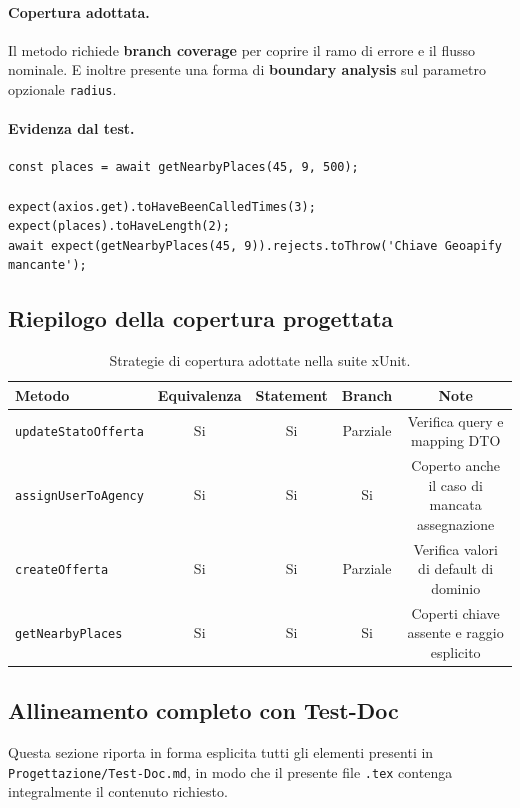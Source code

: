 \documentclass[a4paper,11pt]{article}
\begin{document}
\paragraph{Copertura adottata.}
Il metodo richiede \textbf{branch coverage} per coprire il ramo di errore e il flusso nominale. E inoltre presente una forma di \textbf{boundary analysis} sul parametro opzionale \texttt{radius}.

\paragraph{Evidenza dal test.}
\begin{lstlisting}[style=projectcode]
const places = await getNearbyPlaces(45, 9, 500);

expect(axios.get).toHaveBeenCalledTimes(3);
expect(places).toHaveLength(2);
await expect(getNearbyPlaces(45, 9)).rejects.toThrow('Chiave Geoapify mancante');
\end{lstlisting}

\subsection{Riepilogo della copertura progettata}
\begin{table}[H]
\centering
\begin{tabularx}{\textwidth}{@{}l c c c c@{}}
\toprule
Metodo & Equivalenza & Statement & Branch & Note \\
\midrule
\texttt{updateStatoOfferta} & Si & Si & Parziale & Verifica query e mapping DTO \\
\texttt{assignUserToAgency} & Si & Si & Si & Coperto anche il caso di mancata assegnazione \\
\texttt{createOfferta} & Si & Si & Parziale & Verifica valori di default di dominio \\
\texttt{getNearbyPlaces} & Si & Si & Si & Coperti chiave assente e raggio esplicito \\
\bottomrule
\end{tabularx}
\caption{Strategie di copertura adottate nella suite xUnit.}
\label{tab:coverage-strategy}
\end{table}

\subsection{Allineamento completo con Test-Doc}
Questa sezione riporta in forma esplicita tutti gli elementi presenti in \texttt{Progettazione/Test-Doc.md}, in modo che il presente file \texttt{.tex} contenga integralmente il contenuto richiesto.
\end{document}
